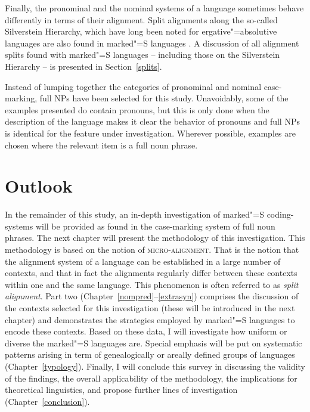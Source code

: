 Finally, the pronominal and the nominal systems of a language sometimes behave differently in terms of their alignment. 
Split alignments along the so-called Silverstein Hierarchy, which have long been noted for ergative"=absolutive languages \citep{Silverstein:1976,Dixon:1994} are also found in marked"=S languages \citep{Handschuh:2008,Handschuh:2014}. 
A discussion of all alignment splits found with marked"=S languages -- including those on the Silverstein Hierarchy -- is presented in Section~\ref{splits}. 

Instead of lumping together the categories of pronominal and nominal case-marking, full NPs have been selected for this study.    
Unavoidably, some of the examples presented do contain pronouns, but this is only done when the description of the language makes it clear the behavior of pronouns and full NPs is identical for the feature under investigation. 
Wherever possible, examples are chosen where the relevant item is a full noun phrase.


\section{Outlook}\label{outline}

In the remainder of this study, an in-depth investigation of marked"=S coding-systems will be provided as found in the case-marking system of full noun phra\-ses.
The next chapter will present the methodology of this investigation. 
This methodology is based on the notion of \textsc{micro-alignment}. 
That is the notion that the alignment system of a language can be established in a large number of contexts, and that in fact the alignments regularly differ between these contexts within one and the same language. This phenomenon is often referred to as \textit{split alignment}.
Part two (Chapter~\ref{nompred}--\ref{extrasyn}) comprises the discussion of the contexts selected for this investigation (these will be introduced in the next chapter) and demonstrates the strategies employed by marked"=S languages to encode these contexts.
Based on these data, I will investigate how uniform or diverse the marked"=S languages are. 
Special emphasis will be put on systematic patterns arising in term of genealogically or areally defined groups of languages (Chapter~\ref{typology}).
Finally, I will conclude this survey in discussing the validity of the findings, the overall applicability of the methodology, the implications for theoretical linguistics, and propose further lines of investigation (Chapter~\ref{conclusion}).     


 

